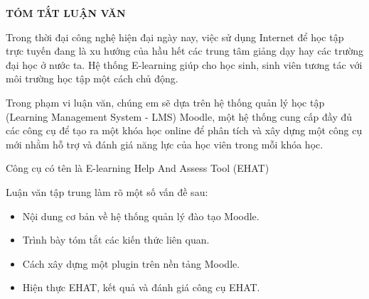 \centerline{\bf \large\MakeUppercase{Tóm tắt luận văn}}
\vspace{20pt}

Trong thời đại công nghệ hiện đại ngày nay, việc sử dụng Internet để học tập trực tuyến đang là xu hướng của hầu hết các trung tâm giảng dạy hay các trường đại học ở nước ta. Hệ thống E-learning giúp cho học sinh, sinh viên tương tác với môi trường học tập một cách chủ động.

Trong phạm vi luận văn, chúng em sẽ dựa trên hệ thống quản lý học tập (Learning Management System - LMS) Moodle, một hệ thống cung cấp đầy đủ các công cụ để tạo ra một khóa học online để phân tích và xây dựng một công cụ mới nhằm hỗ trợ và đánh giá năng lực của học viên trong mỗi khóa học. 

Công cụ có tên là E-learning Help And Assess Tool (EHAT)

Luận văn tập trung làm rõ một số vấn đề sau:
\begin{itemize}
	\item Nội dung cơ bản về hệ thống quản lý đào tạo Moodle.
	\item Trình bày tóm tắt các kiến thức liên quan.
	\item Cách xây dựng một plugin trên nền tảng Moodle.
	\item Hiện thực EHAT, kết quả và đánh giá công cụ EHAT.
\end{itemize}